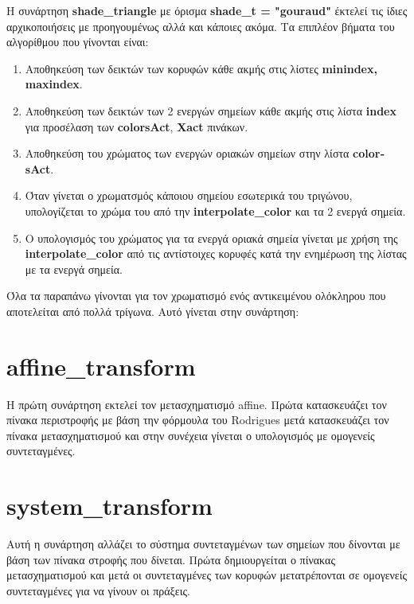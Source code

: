 \documentclass[10pt,a4paper]{article}
\begin{document}
H συνάρτηση \textbf{\textlatin{shade\_triangle}} με όρισμα \textbf{\textlatin{shade\_t = "gouraud"}} έκτελεί τις ίδιες αρχικοποιήσεις με προηγουμένως αλλά και κάποιες ακόμα. Τα επιπλέον βήματα του αλγορίθμου που γίνονται είναι:
\begin{enumerate}
    \item Αποθηκεύση των δεικτών των κορυφών κάθε ακμής στις λίστες \textbf{\textlatin{minindex, maxindex}}.
    \item Αποθηκεύση των δεικτών των 2 ενεργών σημείων κάθε ακμής στις λίστα \textbf{\textlatin{index}} για προσέλαση των \textbf{\textlatin{colorsAct}}, \textbf{\textlatin{Xact}} πινάκων.
    \item Αποθηκεύση του χρώματος των ενεργών οριακών σημείων στην λίστα  \textbf{\textlatin{colorsAct}}.
    \item Όταν γίνεται ο χρωματσμός κάποιου σημείου εσωτερικά του τριγώνου, υπολογίζεται το χρώμα του από την \textbf{\textlatin{interpolate\_color}} και τα 2 ενεργά σημεία. 
    \item Ο υπολογισμός του χρώματος για τα ενεργά οριακά σημεία γίνεται με χρήση της \textbf{\textlatin{interpolate\_color}} από τις αντίστοιχες κορυφές κατά την ενημέρωση της λίστας με τα ενεργά σημεία.
\end{enumerate}

Όλα τα παραπάνω γίνονται για τον χρωματισμό ενός αντικειμένου
ολόκληρου που αποτελείται από πολλά τρίγωνα. Αυτό γίνεται στην συνάρτηση:

\section*{\textlatin{affine\_transform}}

Η πρώτη συνάρτηση εκτελεί τον μετασχηματισμό \textlatin{affine}. Πρώτα κατασκευάζει τον πίνακα
περιστροφής με βάση την φόρμουλα του \textlatin{Rodrigues} μετά κατασκευάζει τον πίνακα μετασχηματισμού και
στην συνέχεια γίνεται ο υπολογισμός με ομογενείς συντεταγμένες.


\section*{\textlatin{system\_transform}}
Αυτή η συνάρτηση αλλάζει το σύστημα συντεταγμένων των σημείων που δίνονται με βάση των
πίνακα στροφής που δίνεται. Πρώτα δημιουργείται ο πίνακας μετασχηματισμού και μετά οι
συντεταγμένες των κορυφών μετατρέπονται σε ομογενείς συντεταγμένες για να γίνουν οι πράξεις.
\end{document}
